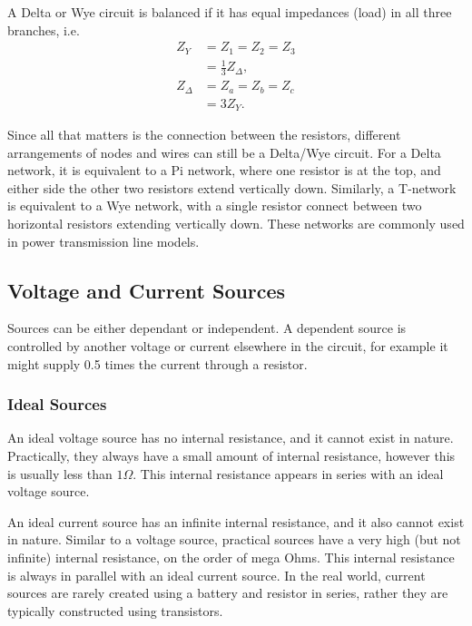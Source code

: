 \documentclass{article}
\begin{document}
A Delta or Wye circuit is balanced if it has equal impedances (load) in all three branches, i.e.
\begin{align*}
    Z_Y &= Z_1=Z_2=Z_3\\
        &= \frac{1}{3}Z_\Delta,\\
    Z_\Delta &= Z_a=Z_b=Z_c\\
             &= 3Z_Y.
\end{align*}

Since all that matters is the connection between the resistors, different arrangements of nodes and wires can still be a Delta/Wye circuit. For a Delta network, it is equivalent to a Pi network, where one resistor is at the top, and either side the other two resistors extend vertically down. Similarly, a T-network is equivalent to a Wye network, with a single resistor connect between two horizontal resistors extending vertically down. These networks are commonly used in power transmission line models.

\subsection{Voltage and Current Sources}
Sources can be either dependant or independent. A dependent source is controlled by another voltage or current elsewhere in the circuit, for example it might supply 0.5 times the current through a resistor.

\subsubsection{Ideal Sources}
An ideal voltage source has no internal resistance, and it cannot exist in nature. Practically, they always have a small amount of internal resistance, however this is usually less than $1\Omega $. This internal resistance appears in series with an ideal voltage source.

An ideal current source has an infinite internal resistance, and it also cannot exist in nature. Similar to a voltage source, practical sources have a very high (but not infinite) internal resistance, on the order of mega Ohms. This internal resistance is always in parallel with an ideal current source. In the real world, current sources are rarely created using a battery and resistor in series, rather they are typically constructed using transistors.
\end{document}

